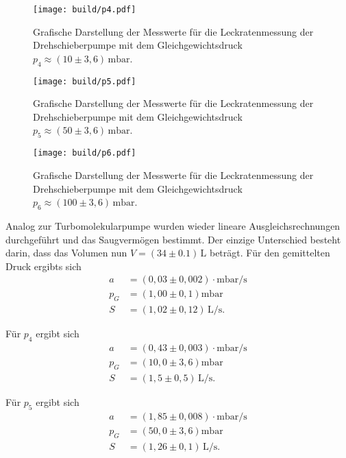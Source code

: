 \begin{figure}[H]
  \centering
  \texttt{[image: build/p4.pdf]}
  \caption{Grafische Darstellung der Messwerte für die Leckratenmessung der Drehschieberpumpe mit dem
  Gleichgewichtsdruck $p_4 \approx (10 \pm 3,6)\, \si{\milli\bar}$.}
  \label{fig:drehleck1}
\end{figure}

\begin{figure}[H]
  \centering
  \texttt{[image: build/p5.pdf]}
  \caption{Grafische Darstellung der Messwerte für die Leckratenmessung der Drehschieberpumpe mit dem
  Gleichgewichtsdruck $p_5 \approx (50 \pm 3,6)\,\si{\milli\bar}$.}
  \label{fig:drehleck2}
\end{figure}

\begin{figure}[H]
  \centering
  \texttt{[image: build/p6.pdf]}
  \caption{Grafische Darstellung der Messwerte für die Leckratenmessung der Drehschieberpumpe mit dem
  Gleichgewichtsdruck $p_6 \approx (100 \pm 3,6) \,\si{\milli\bar}$.}
  \label{fig:drehleck3}
\end{figure}
Analog zur Turbomolekularpumpe wurden wieder lineare Ausgleichsrechnungen durchgeführt und das Saugvermögen bestimmt.
Der einzige Unterschied besteht darin, dass das Volumen nun $V=(34 \pm 0.1)\,\si{\liter}$ beträgt.
Für den gemittelten Druck ergibts sich
\begin{align*}
  a &= (0,03 \pm 0,002)\cdot \si{\milli\bar\per\second} \\
  p_G &= (1,00 \pm 0,1)  \si{\milli\bar} \\
  S &= (1,02 \pm 0,12)\,\si{\liter\per\second}.
\end{align*}

Für $p_4$ ergibt sich
\begin{align*}
  a &= (0,43 \pm 0,003)\cdot \si{\milli\bar\per\second} \\
  p_G &= (10,0 \pm 3,6)  \si{\milli\bar} \\
  S &= (1,5 \pm 0,5)\,\si{\liter\per\second}.
\end{align*}

Für $p_5$ ergibt sich
\begin{align*}
  a &= (1,85 \pm 0,008)\cdot \si{\milli\bar\per\second} \\
  p_G &= (50,0 \pm 3,6)  \si{\milli\bar} \\
  S &= (1,26 \pm 0,1)\,\si{\liter\per\second}.
\end{align*}

